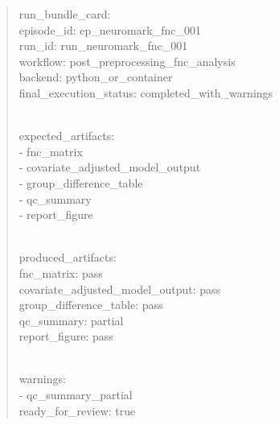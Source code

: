 \begin{quote}
run\_\allowbreak{}bundle\_\allowbreak{}card:\\
episode\_\allowbreak{}id: ep\_\allowbreak{}neuromark\_\allowbreak{}fnc\_\allowbreak{}001\\
run\_\allowbreak{}id: run\_\allowbreak{}neuromark\_\allowbreak{}fnc\_\allowbreak{}001\\
workflow: post\_\allowbreak{}preprocessing\_\allowbreak{}fnc\_\allowbreak{}analysis\\
backend: python\_\allowbreak{}or\_\allowbreak{}container\\
final\_\allowbreak{}execution\_\allowbreak{}status: completed\_\allowbreak{}with\_\allowbreak{}warnings\\
\strut \\
expected\_\allowbreak{}artifacts:\\
- fnc\_\allowbreak{}matrix\\
- covariate\_\allowbreak{}adjusted\_\allowbreak{}model\_\allowbreak{}output\\
- group\_\allowbreak{}difference\_\allowbreak{}table\\
- qc\_\allowbreak{}summary\\
- report\_\allowbreak{}figure\\
\strut \\
produced\_\allowbreak{}artifacts:\\
fnc\_\allowbreak{}matrix: pass\\
covariate\_\allowbreak{}adjusted\_\allowbreak{}model\_\allowbreak{}output: pass\\
group\_\allowbreak{}difference\_\allowbreak{}table: pass\\
qc\_\allowbreak{}summary: partial\\
report\_\allowbreak{}figure: pass\\
\strut \\
warnings:\\
- qc\_\allowbreak{}summary\_\allowbreak{}partial\\
ready\_\allowbreak{}for\_\allowbreak{}review: true
\end{quote}
